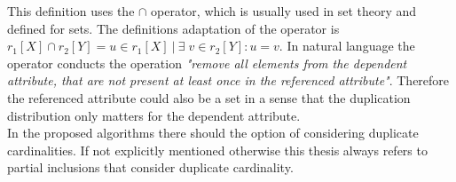 \noindent 
This definition uses the $\cap$ operator, which is usually used in set theory and defined for sets. 
The definitions adaptation of the operator is $r_1[X] \cap r_2[Y] = u \in r_1[X] \: | \: \exists \; v \in r_2[Y] : u = v$.
In natural language the operator conducts the operation \textit{"remove all elements from the dependent attribute, that are not present at least once in the referenced attribute"}. Therefore the referenced attribute could also be a set in a sense that the duplication distribution only matters for the dependent attribute.\\

\noindent In the proposed algorithms there should the option of considering duplicate cardinalities. If not explicitly mentioned otherwise this thesis always refers to partial inclusions that consider duplicate cardinality.

